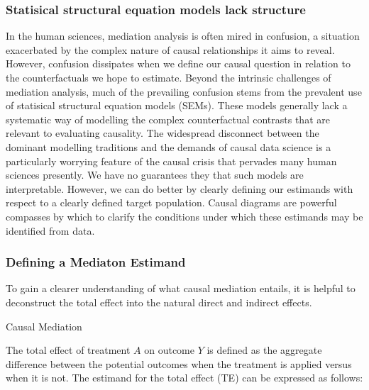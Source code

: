 \documentclass[
  single column]{article}
\begin{document}
\subsubsection{Statisical structural equation models lack
structure}\label{statisical-structural-equation-models-lack-structure}

In the human sciences, mediation analysis is often mired in confusion, a
situation exacerbated by the complex nature of causal relationships it
aims to reveal. However, confusion dissipates when we define our causal
question in relation to the counterfactuals we hope to estimate. Beyond
the intrinsic challenges of mediation analysis, much of the prevailing
confusion stems from the prevalent use of statisical structural equation
models (SEMs). These models generally lack a systematic way of modelling
the complex counterfactual contrasts that are relevant to evaluating
causality. The widespread disconnect between the dominant modelling
traditions and the demands of causal data science is a particularly
worrying feature of the causal crisis that pervades many human sciences
presently. We have no guarantees they that such models are
interpretable. However, we can do better by clearly defining our
estimands with respect to a clearly defined target population. Causal
diagrams are powerful compasses by which to clarify the conditions under
which these estimands may be identified from data.

\subsubsection{Defining a Mediaton
Estimand}\label{defining-a-mediaton-estimand}

To gain a clearer understanding of what causal mediation entails, it is
helpful to deconstruct the total effect into the natural direct and
indirect effects.

\begin{table}

\caption{\label{tbl-medationpuzzle}Causal Mediation}

\centering{

\mediationpuzzle

}

\end{table}%

The total effect of treatment \(A\) on outcome \(Y\) is defined as the
aggregate difference between the potential outcomes when the treatment
is applied versus when it is not. The estimand for the total effect (TE)
can be expressed as follows:
\end{document}
